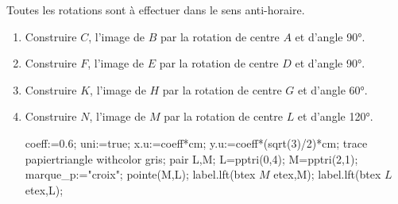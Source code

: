 \begin{exercice*}
    Toutes les rotations sont à effectuer dans le sens anti-horaire.
    \begin{enumerate}
        \item Construire $C$, l'image de $B$ par la rotation de centre $A$ et d'angle \ang{90}.\\
        \item Construire $F$, l'image de $E$ par la rotation de centre $D$ et d'angle \ang{90}.\\
        \item Construire $K$, l'image de $H$ par la rotation de centre $G$ et d'angle \ang{60}.\\
        \item Construire $N$, l'image de $M$ par la rotation de centre $L$ et d'angle \ang{120}.\\
        \begin{Geometrie}[CoinHD={(3u,4u)}]
            coeff:=0.6;
            uni:=true;
            x.u:=coeff*cm;
            y.u:=coeff*(sqrt(3)/2)*cm;
            trace papiertriangle withcolor gris;
            pair L,M;
            L=pptri(0,4);
            M=pptri(2,1);
            marque_p:="croix";
            pointe(M,L);
            label.lft(btex $M$ etex,M);
            label.lft(btex $L$ etex,L);	
        \end{Geometrie}
    \end{enumerate}
\end{exercice*}
